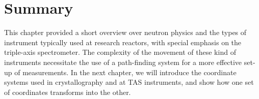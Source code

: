 \section{Summary}

This chapter provided a short overview over neutron physics and the types of instrument typically used at research
reactors, with special emphasis on the triple-axis spectrometer. The complexity of the movement of these kind of
instruments necessitate the use of a path-finding system for a more effective set-up of measurements.
In the next chapter, we will introduce the coordinate systems used in crystallography and at TAS instruments,
and show how one set of coordinates transforms into the other.
